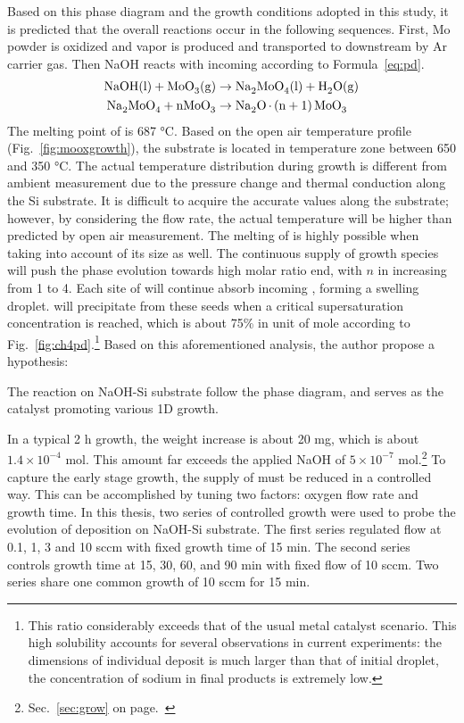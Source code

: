 Based on this phase diagram and the growth conditions adopted in this study, it is predicted that the overall reactions occur in the following sequences. First, Mo powder is oxidized and  vapor is produced and transported to downstream by Ar carrier gas. Then NaOH reacts with incoming  according to Formula~\ref{eq:pd}. 
\begin{subequations}\label{eq:pd}
\begin{align}
\cee{NaOH(l) + MoO3(g) &\rightarrow Na2MoO4(l) + H2O(g)\\
Na2MoO4 + nMoO3   &\rightarrow Na2O.(n + 1)MoO3}
\end{align}
\end{subequations}
The melting point of  is 687 \si{\degreeCelsius}. Based on the open air temperature profile (Fig.~\ref{fig:mooxgrowth}), the substrate is located in temperature zone between 650 and 350 \si{\degreeCelsius}. The actual temperature distribution during growth is different from ambient measurement due to the pressure change and thermal conduction along the Si substrate. It is difficult to acquire the accurate values along the substrate; however, by considering the flow rate, the actual temperature will be higher than predicted by open air measurement.\cite{Subannajui2010} The melting of  is highly possible when taking into account of its size as well.\cite{Bruggemann1997} The continuous supply of  growth species will push the phase evolution towards high  molar ratio end, with $n$ in  increasing from 1 to 4. Each site of  will continue absorb incoming , forming a swelling droplet.  will precipitate from these seeds when a critical supersaturation concentration is reached, which is about 75\% in unit of mole according to Fig.~\ref{fig:ch4pd}.\footnote{This ratio considerably exceeds that of the usual metal catalyst scenario. This high solubility accounts for several observations in current experiments: the dimensions of individual deposit is much larger than that of initial droplet, the concentration of sodium in final products is extremely low.}    Based on this aforementioned analysis, the author propose a hypothesis:


The reaction on NaOH-Si substrate follow the phase diagram, and  serves as the catalyst promoting various 1D  growth.


In a typical 2 h growth, the  weight increase is about 20 mg, which is about $1.4\times 10^{-4}$ mol. This amount far exceeds the applied NaOH of $5\times 10^{-7}$ mol.\footnote{Sec.~\ref{sec:grow} on page.~\pageref{sec:grow}} To capture the early stage growth, the supply of  must be reduced in a controlled way. This can be accomplished by tuning two factors: oxygen flow rate and growth time. In this thesis, two series of controlled growth were used to probe the evolution of  deposition on NaOH-Si substrate. The first series regulated  flow at 0.1, 1, 3 and 10 sccm with fixed growth time of 15 min. The second series controls growth time at 15, 30, 60, and 90 min with fixed  flow of 10 sccm. Two series share one common growth of 10 sccm  for 15 min. 

